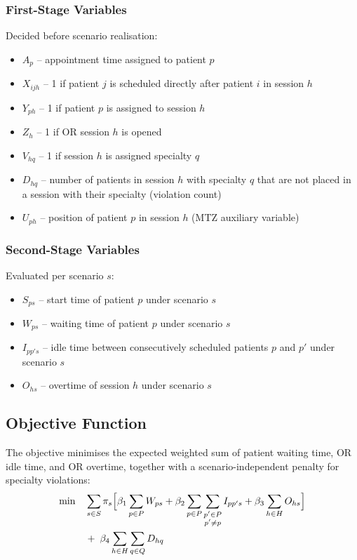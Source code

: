 \subsubsection{First-Stage Variables}
Decided before scenario realisation:
\begin{itemize}
  \item $A_p$ -- appointment time assigned to patient $p$
  \item $X_{ijh}$ -- 1 if patient $j$ is scheduled directly after
        patient $i$ in session $h$
  \item $Y_{ph}$ -- 1 if patient $p$ is assigned to session $h$
  \item $Z_h$ -- 1 if OR session $h$ is opened
  \item $V_{hq}$ -- 1 if session $h$ is assigned specialty $q$
  \item $D_{hq}$ -- number of patients in session $h$ with specialty $q$
        that are not placed in a session with their specialty (violation count)
  \item $U_{ph}$ -- position of patient $p$ in session
        $h$ (MTZ auxiliary variable)
\end{itemize}

\subsubsection{Second-Stage Variables}
Evaluated per scenario $s$:
\begin{itemize}
  \item $S_{ps}$ -- start time of patient $p$ under
        scenario $s$
  \item $W_{ps}$ -- waiting time of patient $p$ under scenario $s$
  \item $I_{pp's}$ -- idle time between consecutively scheduled patients $p$ and $p'$ under scenario $s$
  \item $O_{hs}$ -- overtime of session $h$ under scenario $s$
\end{itemize}

\subsection{Objective Function}

The objective minimises the expected weighted sum of patient waiting time, OR
idle time, and OR overtime, together with a scenario-independent penalty for
specialty violations:
%
\begin{align}
  \min \quad
    & \sum_{s \in S} \pi_s \Bigl[
        \beta_1 \sum_{p \in P} W_{ps}
      + \beta_2 \sum_{p \in P}\sum_{\substack{p' \in P \\ p' \neq p}} I_{pp's}
      + \beta_3 \sum_{h \in H} O_{hs}
      \Bigr] \nonumber \\
    & + \; \beta_4 \sum_{h \in H} \sum_{q \in Q} D_{hq}
  \label{eq:obj}
\end{align}

